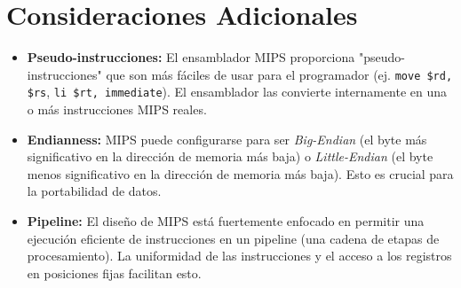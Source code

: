 \documentclass[letterpaper]{article}
\begin{document}
	\section{Consideraciones Adicionales}
	\begin{itemize}
		\item \textbf{Pseudo-instrucciones:} El ensamblador MIPS proporciona "pseudo-instrucciones" que son más fáciles de usar para el programador (ej. \texttt{move \$rd, \$rs}, \texttt{li \$rt, immediate}). El ensamblador las convierte internamente en una o más instrucciones MIPS reales.
		\item \textbf{Endianness:} MIPS puede configurarse para ser \textit{Big-Endian} (el byte más significativo en la dirección de memoria más baja) o \textit{Little-Endian} (el byte menos significativo en la dirección de memoria más baja). Esto es crucial para la portabilidad de datos.
		\item \textbf{Pipeline:} El diseño de MIPS está fuertemente enfocado en permitir una ejecución eficiente de instrucciones en un pipeline (una cadena de etapas de procesamiento). La uniformidad de las instrucciones y el acceso a los registros en posiciones fijas facilitan esto.
	\end{itemize}
	
\end{document}
